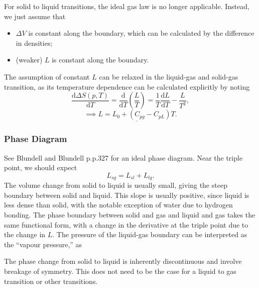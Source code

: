 \documentclass{article}
\theoremstyle{nonumberplain}
\begin{document}
For solid to liquid transitions, the ideal gas law is no longer applicable. Instead, we just assume that
\begin{itemize}
    \item $\Delta V$ is constant along the boundary, which can be calculated by the difference in densities;
    \item (weaker) $L$ is constant along the boundary.
\end{itemize}

The assumption of constant $L$ can be relaxed in the liquid-gas and solid-gas transition, as its temperature dependence can be calculated explicitly by noting 
\[
    \frac{\mathrm{d}\Delta S(p,T)}{\mathrm{d}T} = \frac{\mathrm{d}}{\mathrm{d}T} \left(\frac{L}{T} \right) = \frac{1}{T}\frac{\mathrm{d}L}{\mathrm{d}T} - \frac{L}{T^2},
\]
\[
    \implies  
    \underline{L = L_0 + (C_{pg} - C_{pL}) T}. 
\]

\subsubsection{Phase Diagram}
See Blundell and Blundell p.p.327 for an ideal phase diagram. Near the triple point, we should expect 
\[
    L_{sg} = L_{sl} + L_{lg}. 
\]
The volume change from solid to liquid is usually small, giving the steep boundary between solid and liquid. This slope is usually positive, since liquid is less dense than solid, with the notable exception of water due to hydrogen bonding. The phase boundary between solid and gas and liquid and gas takes the same functional form, with a change in the derivative at the triple point due to the change in $L.$ The pressure of the liquid-gas boundary can be interpreted as the ``vapour pressure,'' as 

The phase change from solid to liquid is inherently discontinuous and involve breakage of symmetry. This does not need to be the case for a liquid to gas transition or other transitions. 
\end{document}
